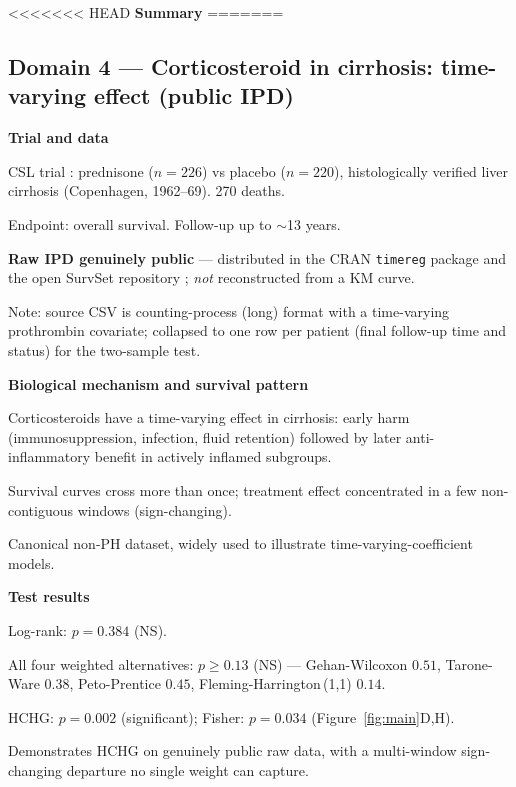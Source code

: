 \documentclass[unnumsec,webpdf,contemporary,large]{oup-authoring-template}
\let\origitemize\itemize
\let\origenditemize\enditemize
\renewenvironment{itemize}{%
  \origitemize
  \setlength{\itemsep}{1pt}%
  \setlength{\parskip}{0pt}%
  \setlength{\topsep}{3pt}%
}{\origenditemize}
\begin{document}
<<<<<<< HEAD
\textbf{Summary}
=======
\subsection*{Domain 4 — Corticosteroid in cirrhosis: time-varying effect
  (public IPD)}

\textbf{Trial and data}
\begin{itemize}
  \item CSL trial \citep{csl_data}: prednisone ($n=226$) vs placebo
        ($n=220$), histologically verified liver cirrhosis
        (Copenhagen, 1962--69). 270 deaths.
  \item Endpoint: overall survival. Follow-up up to $\sim$13 years.
  \item \textbf{Raw IPD genuinely public} --- distributed in the CRAN
        \texttt{timereg} package and the open SurvSet repository
        \citep{survset2022}; \emph{not} reconstructed from a KM curve.
  \item Note: source CSV is counting-process (long) format with a
        time-varying prothrombin covariate; collapsed to one row per
        patient (final follow-up time and status) for the two-sample test.
\end{itemize}

\textbf{Biological mechanism and survival pattern}
\begin{itemize}
  \item Corticosteroids have a time-varying effect in cirrhosis: early
        harm (immunosuppression, infection, fluid retention) followed by
        later anti-inflammatory benefit in actively inflamed subgroups.
  \item Survival curves cross more than once; treatment effect concentrated
        in a few non-contiguous windows (sign-changing).
  \item Canonical non-PH dataset, widely used to illustrate
        time-varying-coefficient models.
\end{itemize}

\textbf{Test results}
\begin{itemize}
  \item Log-rank: $p = 0.384$ (NS).
  \item All four weighted alternatives: $p \geq 0.13$ (NS) —
        Gehan-Wilcoxon $0.51$, Tarone-Ware $0.38$, Peto-Prentice $0.45$,
        Fleming-Harrington\,(1,1) $0.14$.
  \item HCHG: $p = 0.002$ (significant); Fisher: $p = 0.034$
        (Figure~\ref{fig:main}D,H).
  \item Demonstrates HCHG on genuinely public raw data, with a multi-window
        sign-changing departure no single weight can capture.
\end{itemize}
\end{document}
